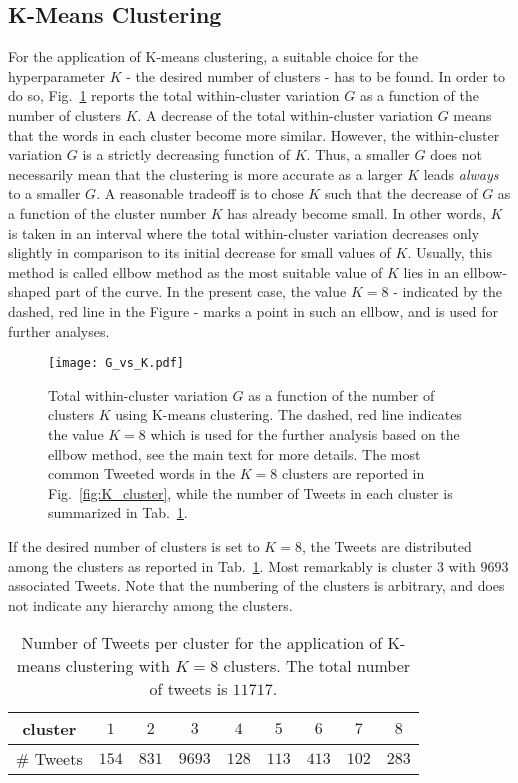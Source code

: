 \subsection{K-Means Clustering}

For the application of K-means clustering, a suitable choice for the hyperparameter $K$ - the desired number of clusters - has to be found. In order to do so, Fig.~\ref{fig:G_vs_K} reports the total within-cluster variation $G$ as a function of the number of clusters $K$. A decrease of the total within-cluster variation $G$ means that the words in each cluster become more similar. However, the within-cluster variation $G$ is a strictly decreasing function of $K$. Thus, a smaller $G$ does not necessarily mean that the clustering is more accurate as a larger $K$ leads \textit{always} to a smaller $G$. A reasonable tradeoff is to chose $K$ such that the decrease of $G$ as a function of the cluster number $K$ has already become small. In other words, $K$ is taken in an interval where the total within-cluster variation decreases only slightly in comparison to its initial decrease for small values of $K$. Usually, this method is called ellbow method as the most suitable value of $K$ lies in an ellbow-shaped part of the curve. In the present case, the value $K=8$ - indicated by the dashed, red line in the Figure - marks a point in such an ellbow, and is used for further analyses.

\begin{figure}[h!]
\centering
\texttt{[image: G\_vs\_K.pdf]}
\caption{Total within-cluster variation $G$ as a function of the number of clusters $K$ using K-means clustering. The dashed, red line indicates the value $K=8$ which is used for the further analysis based on the ellbow method, see the main text for more details. The most common Tweeted words in the $K=8$ clusters are reported in Fig.~\ref{fig:K_cluster}, while the number of Tweets in each cluster is summarized in Tab.~\ref{tab:tweets_per_cluster}.}
\label{fig:G_vs_K}
\end{figure}

If the desired number of clusters is set to $K=8$, the Tweets are distributed among the clusters as reported in Tab.~\ref{tab:tweets_per_cluster}. Most remarkably is cluster $3$ with $9693$ associated Tweets. Note that the numbering of the clusters is arbitrary, and does not indicate any hierarchy among the clusters.

\begin{table}[h!]
\centering
\begin{tabular}{c||c|c|c|c|c|c|c|c} 
cluster & $1$ & $2$ &$3$ &$4$ &$5$ &$6$ &$7$ &$8$ \\
 \hline
\# Tweets & $154$ & $831$ &$9693$ &$128$ &$113$ &$413$ &$102$ &$283$
\end{tabular}
\caption{Number of Tweets per cluster for the application of K-means clustering with $K=8$ clusters. The total number of tweets is $11717$.}
\label{tab:tweets_per_cluster}
\end{table}

